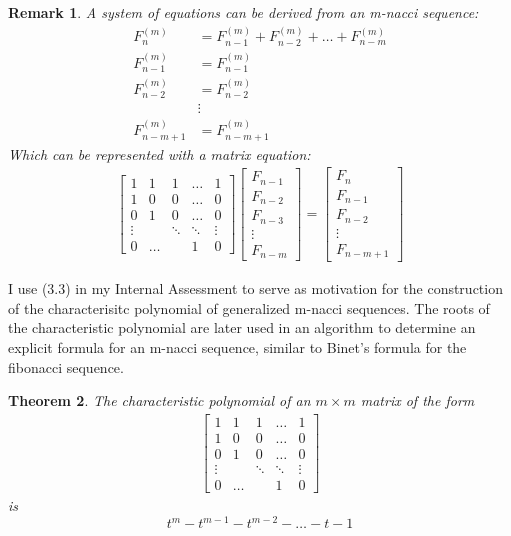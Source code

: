 \documentclass[11pt]{article}
\newtheorem{theorem}{Theorem}[section]
\newtheorem{remark}[theorem]{Remark}
\begin{document}
\begin{remark}
    A system of equations can be derived from an m-nacci sequence:
    \begin{align*}
        F_n^{(m)} &= F^{(m)}_{n-1}+F^{(m)}_{n-2}+\dots+F^{(m)}_{n-m} \\ 
        F_{n-1}^{(m)} &= F_{n-1}^{(m)} \\ 
        F_{n-2}^{(m)} &= F_{n-2}^{(m)} \\
        &\vdots \\ 
        F_{n-m+1}^{(m)} &= F_{n-m+1}^{(m)}
    \end{align*}
    Which can be represented with a matrix equation:
    \begin{align*}
        \begin{bmatrix} 
            1 & 1 & 1 & \dots & 1 \\
            1 & 0 & 0 & \dots & 0 \\
            0 & 1 & 0 & \dots & 0 \\
            \vdots & & \ddots & \ddots  & \vdots \\ 
            0 & \dots & & 1 & 0
        \end{bmatrix}
        \begin{bmatrix} 
            F_{n-1} \\
            F_{n-2} \\
            F_{n-3} \\
            \vdots \\ 
            F_{n-m}
        \end{bmatrix} = 
        \begin{bmatrix} 
            F_{n} \\
            F_{n-1} \\
            F_{n-2} \\
            \vdots \\ 
            F_{n-m+1}
        \end{bmatrix}
    \end{align*}
\end{remark}

I use (3.3) in my Internal Assessment to serve as motivation for the construction of the characterisitc polynomial of generalized m-nacci sequences. The roots of the characteristic polynomial are later used in an algorithm to determine an explicit formula for an m-nacci sequence, similar to Binet's formula for the fibonacci sequence.

\begin{theorem}
    The characteristic polynomial of an $m\times m$ matrix of the form 
    \begin{align*}
    \begin{bmatrix} 
        1 & 1 & 1 & \dots & 1 \\
        1 & 0 & 0 & \dots & 0 \\
        0 & 1 & 0 & \dots & 0 \\
        \vdots & & \ddots & \ddots  & \vdots \\ 
        0 & \dots & & 1 & 0
    \end{bmatrix}
    \end{align*}
    is 
    $$t^m-t^{m-1}-t^{m-2}-\dots-t-1$$
\end{theorem}
\end{document}
